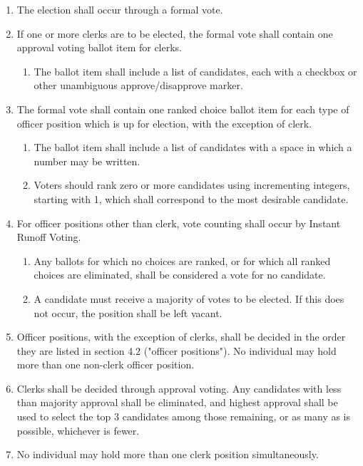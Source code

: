 \documentclass[11pt]{article}
\newcounter{h1}
\newcounter{h2}[h1]
\newcounter{h3}[h2]
\begin{document}

\begin{enumerate}
  \item The election shall occur through a formal vote.
  \item If one or more clerks are to be elected, the formal vote shall contain one approval voting ballot item for clerks.
  \begin{enumerate}
    \item The ballot item shall include a list of candidates, each with a checkbox or other unambiguous approve/disapprove marker.
  \end{enumerate}
  \item The formal vote shall contain one ranked choice ballot item for each type of officer position which is up for election, with the exception of clerk.
  \begin{enumerate}
    \item The ballot item shall include a list of candidates with a space in which a number may be written.
    \item Voters should rank zero or more candidates using incrementing integers, starting with 1, which shall correspond to the most desirable candidate.
  \end{enumerate}
  \item For officer positions other than clerk, vote counting shall occur by Instant Runoff Voting.
  \begin{enumerate}
    \item Any ballots for which no choices are ranked, or for which all ranked choices are eliminated, shall be considered a vote for no candidate.
    \item A candidate must receive a majority of votes to be elected. If this does not occur, the position shall be left vacant.
  \end{enumerate}
  \item Officer positions, with the exception of clerks, shall be decided in the order they are listed in section 4.2 ("officer positions"). No individual may hold more than one non-clerk officer position.
  \item Clerks shall be decided through approval voting. Any candidates with less than majority approval shall be eliminated, and highest approval shall be used to select the top 3 candidates among those remaining, or as many as is possible, whichever is fewer.
  \item No individual may hold more than one clerk position simultaneously.
\end{enumerate}
\end{document}
